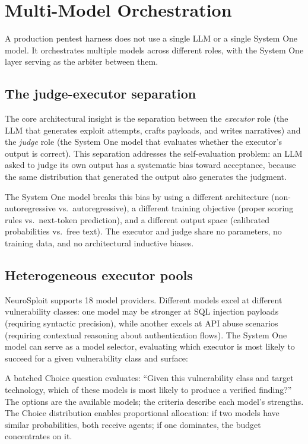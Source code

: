 \documentclass[conference]{IEEEtran}
\begin{document}
\section{Multi-Model Orchestration}\label{sec:orchestration}

A production pentest harness does not use a single LLM or a single System One model. It orchestrates multiple models across different roles, with the System One layer serving as the arbiter between them.

\subsection{The judge-executor separation}

The core architectural insight is the separation between the \emph{executor} role (the LLM that generates exploit attempts, crafts payloads, and writes narratives) and the \emph{judge} role (the System One model that evaluates whether the executor's output is correct). This separation addresses the self-evaluation problem: an LLM asked to judge its own output has a systematic bias toward acceptance, because the same distribution that generated the output also generates the judgment.

The System One model breaks this bias by using a different architecture (non-autoregressive vs.\ autoregressive), a different training objective (proper scoring rules vs.\ next-token prediction), and a different output space (calibrated probabilities vs.\ free text). The executor and judge share no parameters, no training data, and no architectural inductive biases.

\subsection{Heterogeneous executor pools}

NeuroSploit supports 18 model providers. Different models excel at different vulnerability classes: one model may be stronger at SQL injection payloads (requiring syntactic precision), while another excels at API abuse scenarios (requiring contextual reasoning about authentication flows). The System One model can serve as a model selector, evaluating which executor is most likely to succeed for a given vulnerability class and surface:

A batched Choice question evaluates: ``Given this vulnerability class and target technology, which of these models is most likely to produce a verified finding?'' The options are the available models; the criteria describe each model's strengths. The Choice distribution enables proportional allocation: if two models have similar probabilities, both receive agents; if one dominates, the budget concentrates on it.
\end{document}
